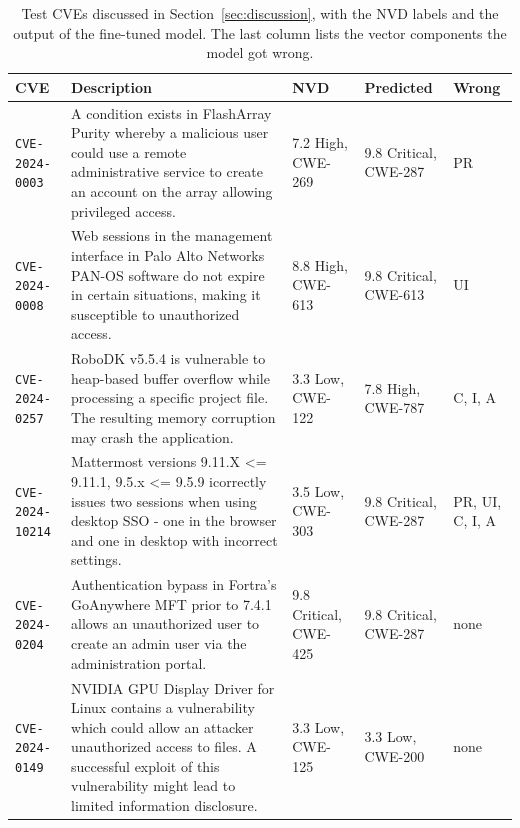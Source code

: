 \begin{table}[t]
\centering
\caption{Test CVEs discussed in Section~\ref{sec:discussion}, with the NVD labels and the output of the fine-tuned model. The last column lists the vector components the model got wrong.}
\label{tab:examples}
\footnotesize
\setlength{\tabcolsep}{4pt}
\begin{tabular}{@{}lp{5.3cm}p{1.9cm}p{1.9cm}l@{}}
\toprule
CVE & Description & NVD & Predicted & Wrong \\
\midrule
\texttt{CVE-2024-0003} & A condition exists in FlashArray Purity whereby a malicious user could use a remote administrative service to create an account on the array allowing privileged access. & 7.2 High, CWE-269 & 9.8 Critical, CWE-287 & PR \\
\texttt{CVE-2024-0008} & Web sessions in the management interface in Palo Alto Networks PAN-OS software do not expire in certain situations, making it susceptible to unauthorized access. & 8.8 High, CWE-613 & 9.8 Critical, CWE-613 & UI \\
\texttt{CVE-2024-0257} & RoboDK v5.5.4 is vulnerable to heap-based buffer overflow while processing a specific project file. The resulting memory corruption may crash the application. & 3.3 Low, CWE-122 & 7.8 High, CWE-787 & C, I, A \\
\texttt{CVE-2024-10214} & Mattermost versions 9.11.X \textless{}= 9.11.1, 9.5.x \textless{}= 9.5.9 icorrectly issues two sessions when using desktop SSO - one in the browser and one in desktop with incorrect settings. & 3.5 Low, CWE-303 & 9.8 Critical, CWE-287 & PR, UI, C, I, A \\
\texttt{CVE-2024-0204} & Authentication bypass in Fortra's GoAnywhere MFT prior to 7.4.1 allows an unauthorized user to create an admin user via the administration portal. & 9.8 Critical, CWE-425 & 9.8 Critical, CWE-287 & none \\
\texttt{CVE-2024-0149} & NVIDIA GPU Display Driver for Linux contains a vulnerability which could allow an attacker unauthorized access to files. A successful exploit of this vulnerability might lead to limited information disclosure. & 3.3 Low, CWE-125 & 3.3 Low, CWE-200 & none \\
\bottomrule
\end{tabular}
\end{table}
